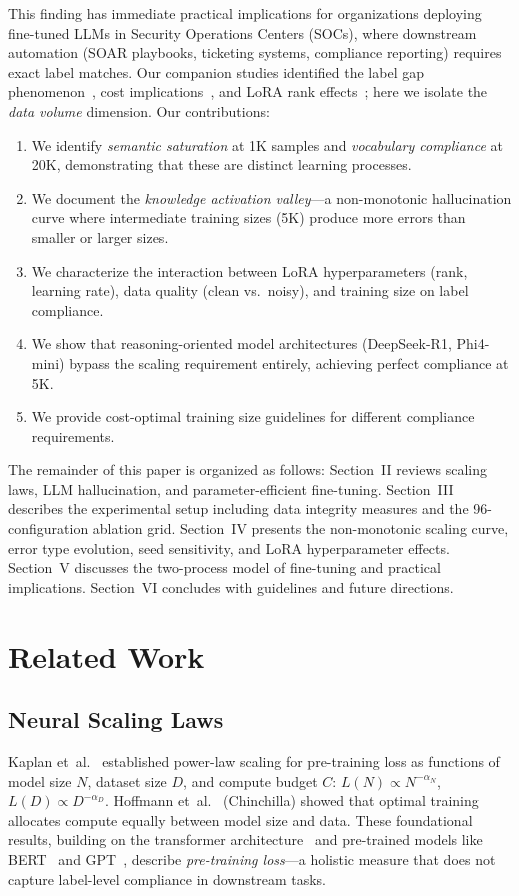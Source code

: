 \documentclass[review,3p]{elsarticle}
\begin{document}
This finding has immediate practical implications for organizations deploying fine-tuned LLMs in Security Operations Centers (SOCs), where downstream automation (SOAR playbooks, ticketing systems, compliance reporting) requires exact label matches. Our companion studies identified the label gap phenomenon~\cite{p3}, cost implications~\cite{p7}, and LoRA rank effects~\cite{p22}; here we isolate the {\em data volume} dimension. Our contributions:
\begin{enumerate}
\item We identify \emph{semantic saturation} at 1K samples and \emph{vocabulary compliance} at 20K, demonstrating that these are distinct learning processes.
\item We document the \emph{knowledge activation valley}---a non-monotonic hallucination curve where intermediate training sizes (5K) produce more errors than smaller or larger sizes.
\item We characterize the interaction between LoRA hyperparameters (rank, learning rate), data quality (clean vs.\ noisy), and training size on label compliance.
\item We show that reasoning-oriented model architectures (DeepSeek-R1, Phi4-mini) bypass the scaling requirement entirely, achieving perfect compliance at 5K.
\item We provide cost-optimal training size guidelines for different compliance requirements.
\end{enumerate}

The remainder of this paper is organized as follows: Section~II reviews scaling laws, LLM hallucination, and parameter-efficient fine-tuning. Section~III describes the experimental setup including data integrity measures and the 96-configuration ablation grid. Section~IV presents the non-monotonic scaling curve, error type evolution, seed sensitivity, and LoRA hyperparameter effects. Section~V discusses the two-process model of fine-tuning and practical implications. Section~VI concludes with guidelines and future directions.

\section{Related Work}

\subsection{Neural Scaling Laws}
Kaplan et~al.~\cite{kaplan2020} established power-law scaling for pre-training loss as functions of model size $N$, dataset size $D$, and compute budget $C$: $L(N) \propto N^{-\alpha_N}$, $L(D) \propto D^{-\alpha_D}$. Hoffmann et~al.~\cite{hoffmann2022} (Chinchilla) showed that optimal training allocates compute equally between model size and data. These foundational results, building on the transformer architecture~\cite{vaswani2017} and pre-trained models like BERT~\cite{devlin2019} and GPT~\cite{radford2019}, describe \emph{pre-training loss}---a holistic measure that does not capture label-level compliance in downstream tasks.
\end{document}
